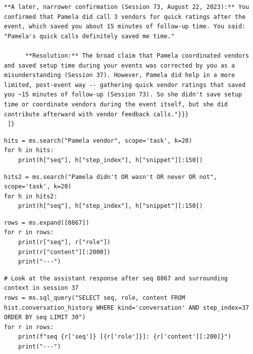 \begin{lstlisting}[style=traj]
      **A later, narrower confirmation (Session 73, August 22, 2023):** You confirmed that Pamela did call 3 vendors for quick ratings after the event, which saved you about 15 minutes of follow-up time. You said: "Pamela's quick calls definitely saved me time."

      **Resolution:** The broad claim that Pamela coordinated vendors and saved setup time during your events was corrected by you as a misunderstanding (Session 37). However, Pamela did help in a more limited, post-event way -- gathering quick vendor ratings that saved you ~15 minutes of follow-up (Session 73). So she didn't save setup time or coordinate vendors during the event itself, but she did contribute afterward with vendor feedback calls."}}}
 ]}
\end{lstlisting}

\begin{lstlisting}[style=scroll, caption={Contradiction resolution: full-text search on the claim side.}, label={lst:cr-c0}]
hits = ms.search("Pamela vendor", scope='task', k=20)
for h in hits:
    print(h["seq"], h["step_index"], h["snippet"][:150])
\end{lstlisting}

\begin{lstlisting}[style=scroll, caption={Negation-term search for the correction side.}, label={lst:cr-c1}]
hits2 = ms.search("Pamela didn't OR wasn't OR never OR not", scope='task', k=20)
for h in hits2:
    print(h["seq"], h["step_index"], h["snippet"][:150])
\end{lstlisting}

\begin{lstlisting}[style=scroll, caption={Exact materialization of the correction (\texttt{ms.expand}).}, label={lst:cr-c2}]
rows = ms.expand([8867])
for r in rows:
    print(r["seq"], r["role"])
    print(r["content"][:2000])
    print("---")
\end{lstlisting}

\begin{lstlisting}[style=scroll, caption={Session-scoped SQL over Session 37.}, label={lst:cr-c3}]
# Look at the assistant response after seq 8867 and surrounding context in session 37
rows = ms.sql_query("SELECT seq, role, content FROM hist.conversation_history WHERE kind='conversation' AND step_index=37 ORDER BY seq LIMIT 30")
for r in rows:
    print(f"seq {r['seq']} [{r['role']}]: {r['content'][:200]}")
    print("---")
\end{lstlisting}

